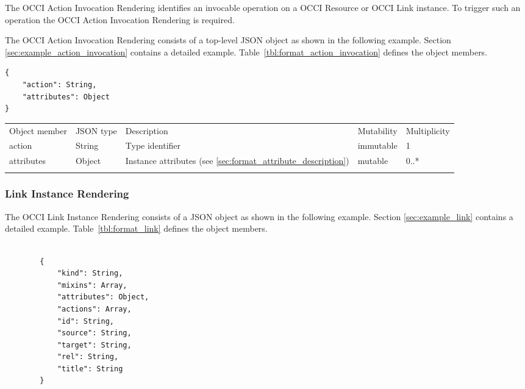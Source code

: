 \documentclass[10pt,a4paper]{article}
\begin{document}
The OCCI Action Invocation Rendering identifies an invocable operation on a OCCI Resource or
OCCI Link instance. To trigger such an operation the OCCI Action Invocation
Rendering is required.

The OCCI Action Invocation Rendering consists of a top-level JSON object as shown in the
following example. Section \ref{sec:example_action_invocation} contains a detailed example.
Table~\ref{tbl:format_action_invocation} defines the object members.

\begin{lstlisting}
{
    "action": String,
    "attributes": Object
}
\end{lstlisting}

 {
    \begin{tabularx}{\textwidth}{llXll}
    \toprule
    Object member & JSON type & Description & Mutability & Multiplicity \\
    \colrule
    action & String & Type identifier & immutable & 1 \\

    attributes & Object & Instance attributes (see
\ref{sec:format_attribute_description}) & mutable & 0..* \\
    \botrule
    \end{tabularx}
}


\subsubsection{Link Instance Rendering}
\label{sec:format_link}

The OCCI Link Instance Rendering consists of a JSON object as shown in the
following example. Section \ref{sec:example_link} contains a detailed example.
Table~\ref{tbl:format_link} defines the object members.
\begin{lstlisting}

        {
            "kind": String,
            "mixins": Array,
            "attributes": Object,
            "actions": Array,
            "id": String,
            "source": String,
            "target": String,
            "rel": String,
            "title": String
        }

\end{lstlisting}
\end{document}
